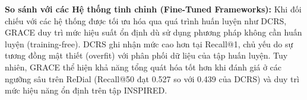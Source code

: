 \textbf{So sánh với các Hệ thống tinh chỉnh (Fine-Tuned Frameworks):}
Khi đối chiếu với các hệ thống được tối ưu hóa qua quá trình huấn luyện như DCRS, GRACE duy trì mức hiệu suất ổn định dù sử dụng phương pháp không cần huấn luyện (training-free). DCRS ghi nhận mức cao hơn tại Recall@1, chủ yếu do sự tương đồng mật thiết (overfit) với phân phối dữ liệu của tập huấn luyện. Tuy nhiên, GRACE thể hiện khả năng tổng quát hóa tốt hơn khi đánh giá ở các ngưỡng sâu trên ReDial (Recall@50 đạt 0.527 so với 0.439 của DCRS) và duy trì mức hiệu năng ổn định trên tập INSPIRED.

\begin{table}[H]
    \caption{Hiệu năng của Mô hình tiền đề (GRACE) so với các hệ thống SOTA trên toàn bộ tập dữ liệu (100\%). Các kết quả tốt nhất được in đậm, và tốt thứ hai được gạch chân.}
    \label{tab:baseline_comparison}
    \centering
\end{table}
